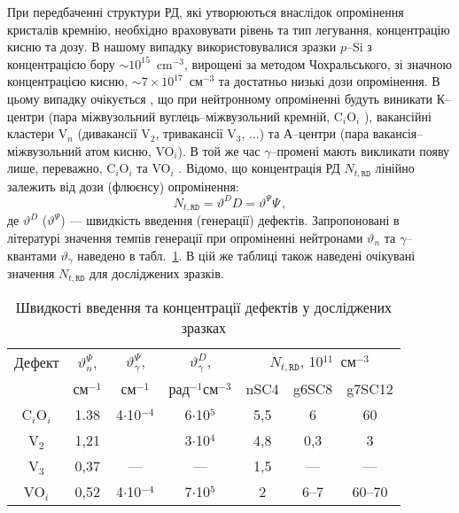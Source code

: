 При передбаченні структури РД, які утворюються внаслідок опромінення кристалів кремнію,
необхідно враховувати рівень та тип легування, концентрацію кисню та дозу.
В нашому випадку використовувалися зразки $p$--Si з концентрацією бору $\sim10^{15}$~cm$^{-3}$,
вирощені за методом Чохральського, зі значною концентрацією
кисню, $\sim7\times10^{17}$~см$^{-3}$ та достатньо низькі дози опромінення.
В цьому випадку очікується \cite{n:long,n:gamma,Moll:PhD}, що при нейтронному опроміненні будуть виникати
К--центри (пара міжвузольний вуглець--міжвузольний кремній, C$_i$O$_i$ ),
вакансійні кластери V$_n$ (дивакансії V$_2$, тривакансії V$_3$, ...) та
А--центри (пара вакансія--міжвузольний атом кисню, VO$_i$).
В той же час $\gamma$--промені мають викликати появу лише, переважно, C$_i$O$_i$ та VO$_i$ \cite{gamma:Stahl,Moll:PhD,gamma:Kolkr,A:Caracas}.
Відомо, що концентрація РД $N_{t,\mathtt{RD}}$ лінійно залежить від дози (флюєнсу) опромінення:
\begin{equation}
\label{eqNtRD}
    N_{t,\mathtt{RD}}=\vartheta^{D} D=\vartheta^{\Psi}\Psi \,,
\end{equation}
де $\vartheta^{D}$ ($\vartheta^{\Psi}$) --- швидкість введення (генерації) дефектів.
Запропоновані в літературі значення темпів генерації при опроміненні нейтронами $\vartheta_n$ та $\gamma$--квантами $\vartheta_\gamma$
наведено в табл.~\ref{tabDefectNt}.
В цій же таблиці також наведені очікувані значення $N_{t,\mathtt{RD}}$ для досліджених зразків.

\begin{table}
\caption{\label{tabDefectNt}Швидкості введення та концентрації дефектів у досліджених зразках
}
\center
\begin{tabular}{|c|c|c|c|c|c|c|}
\hline
Дефект&$\vartheta_n^{\Psi}$,  &$\vartheta_\gamma^{\Psi}$,&$\vartheta_\gamma^D$,&\multicolumn{3}{c|}{$N_{t,\mathtt{RD}}$, 10$^{11}$~см$^{-3}$}\\
\cline{5-7}
&см$^{-1}$ \cite{Moll:PhD}&см$^{-1}$ \cite{gamma:Kolkr}&рад$^{-1}$см$^{-3}$ \cite{gamma:Stahl}&nSC4&g6SC8&g7SC12\\
\hline
C$_i$O$_i$&1.38&4$\cdot$10$^{-4}$&6$\cdot$10$^5$&5,5&6&60\\ \hline
V$_2$&1,21&&3$\cdot$10$^4$&4,8&0,3&3\\ \hline
V$_3$&0,37&---&---&1,5&---&---\\ \hline
VO$_i$&0,52&4$\cdot$10$^{-4}$&7$\cdot$10$^5$&2&6--7&60--70\\\hline
\end{tabular}
\end{table}

